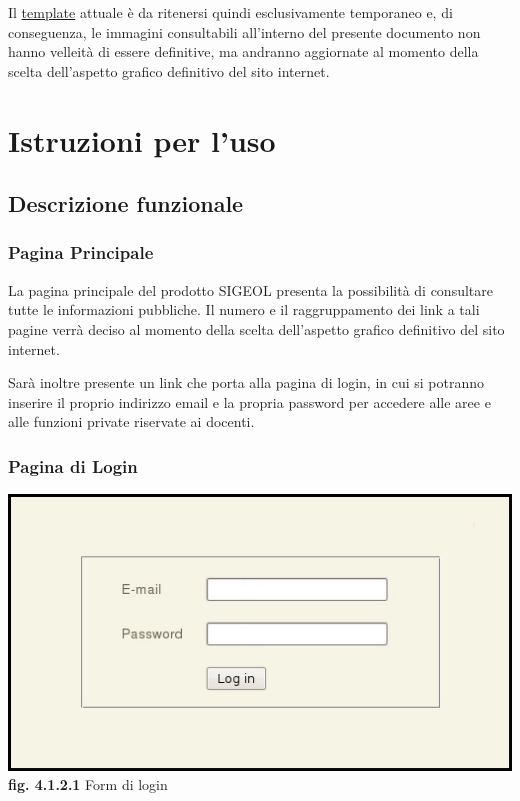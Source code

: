 \documentclass[11pt,a4paper]{article}
\begin{document}
Il \underline{template} attuale è da ritenersi quindi esclusivamente temporaneo e, di conseguenza, le immagini consultabili all'interno del presente documento non hanno velleità di essere definitive, ma andranno aggiornate al momento della scelta dell'aspetto grafico definitivo del sito internet.
\section{Istruzioni per l'uso}
\subsection{Descrizione funzionale}
\subsubsection{Pagina Principale}
La pagina principale del prodotto SIGEOL presenta la possibilità di consultare tutte le informazioni pubbliche. Il numero e il raggruppamento dei link a tali pagine verrà deciso al momento della scelta dell'aspetto grafico definitivo del sito internet.

Sarà inoltre presente un link che porta alla pagina di login, in cui si potranno inserire il proprio indirizzo email e la propria password per accedere alle aree e alle funzioni private riservate ai docenti.
\subsubsection{Pagina di Login}

\begin{center}
	\includegraphics[scale=0.5]{images/login.jpg}\\
	\textbf{fig. 4.1.2.1} Form di login\\
\end{center}
\end{document}
